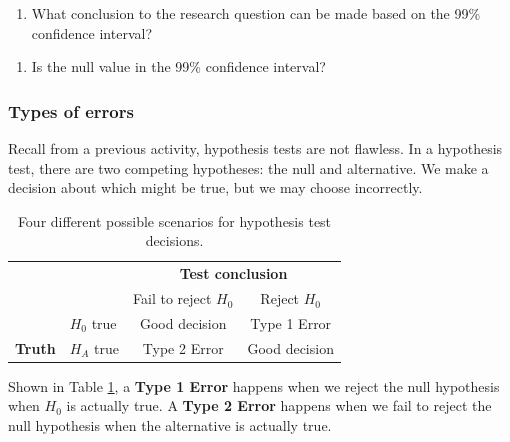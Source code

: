 \documentclass[
]{report}
\providecommand{\tightlist}{%
  \setlength{\itemsep}{0pt}\setlength{\parskip}{0pt}}
\begin{document}
\vspace{1in}

\begin{enumerate}
\def\labelenumi{\arabic{enumi}.}
\setcounter{enumi}{11}
\tightlist
\item
  What conclusion to the research question can be made based on the 99\% confidence interval?
\end{enumerate}

\vspace{0.8in}

\begin{enumerate}
\def\labelenumi{\arabic{enumi}.}
\setcounter{enumi}{12}
\tightlist
\item
  Is the null value in the 99\% confidence interval?
\end{enumerate}

\vspace{0.8in}

\newpage

\hypertarget{types-of-errors}{%
\subsubsection*{Types of errors}\label{types-of-errors}}

Recall from a previous activity, hypothesis tests are not flawless. In a hypothesis test, there are two competing hypotheses: the null and alternative. We make a decision about which might be true, but we may choose incorrectly.

\begin{table}
\caption{Four different possible scenarios for hypothesis test decisions.}
\centering
\begin{tabular}[h]{ll|cc}
\hline
 & &  \multicolumn{2}{c}{\textbf{Test conclusion}} \\
 &  & \multicolumn{1}{c}{Fail to reject $H_0$} & \multicolumn{1}{c}{Reject $H_0$}\\
\hline
 & $H_0$ true & Good decision & Type 1 Error\\
\hline
\textbf{Truth} & $H_A$ true & Type 2 Error & Good decision\\
\hline
\end{tabular}
\label{tab:errors}
\end{table}

Shown in Table \ref{tab:errors}, a \textbf{Type 1 Error} happens when we reject the null hypothesis when \(H_0\) is actually true. A \textbf{Type 2 Error} happens when we fail to reject the null hypothesis when the alternative is actually true.
\end{document}
